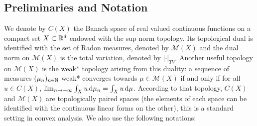 \subsection{Preliminaries and Notation}
We denote by $C(X)$ the Banach space of real valued continuous functions on a compact set $X\subset \mathbb{R}^d$ endowed with the sup norm topology. Its topological dual is identified with the set of Radon measures, denoted by $\mathcal{M}(X)$ and the dual norm on $\mathcal{M}(X)$ is the total variation, denoted by $|\cdot|_{TV}$. Another useful topology on $\mathcal{M}(X)$ is the weak* topology arising from this duality: a sequence of measures $(\mu_n)_{n\in \mathbb{N}}$ weak* converges towards $\mu \in \mathcal{M}(X)$ if and only if for all $u \in C(X)$, $\lim_{n\rightarrow + \infty}\int_{X} u \, \mathrm{d}\mu_n = \int_{X} u \,\mathrm{d}\mu$. According to that topology, $C(X)$ and $\mathcal{M}(X)$ are topologically paired spaces (the elements of each space can be identified with the continuous linear forms on the other), this is a standard setting in convex analysis.
We also use the following notations:
